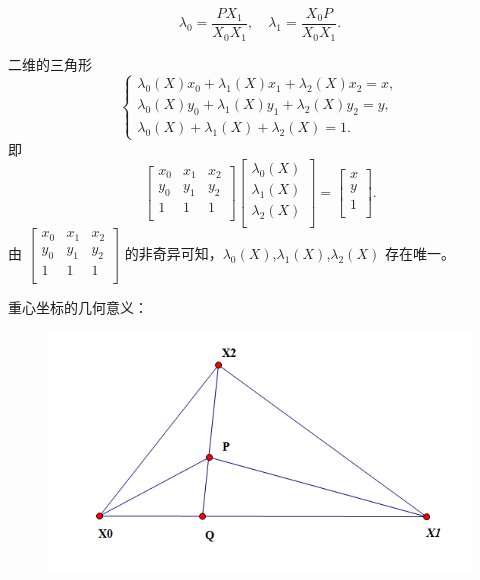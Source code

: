 \documentclass[12pt,a4paper]{article}
\begin{document}
$$\lambda _0 =\frac{PX_1}{X_0 X_1},\quad \lambda _1 =\frac{X_0 P}{X_0 X_1}.$$

二维的三角形
$$
\begin{cases}
\lambda _0(X)x_0+\lambda _1(X)x_1+\lambda _2(X)x_2=x,\\
\lambda _0(X)y_0+\lambda _1(X)y_1+\lambda _2(X)y_2=y,\\
\lambda _0(X)+\lambda _1(X)+\lambda _2(X)=1.
\end{cases}
$$
即
$$
\begin{bmatrix}
x_0 & x_1 & x_2\\
y_0 & y_1 & y_2\\
1 & 1 & 1\\
\end{bmatrix}
\begin{bmatrix}
\lambda _0(X)\\
\lambda _1(X)\\
\lambda _2(X)\\
\end{bmatrix}=\begin{bmatrix}
x\\
y\\
1\\
\end{bmatrix}.
$$
由 $\begin{bmatrix}
x_0 & x_1 & x_2\\
y_0 & y_1 & y_2\\
1 & 1 & 1\\
\end{bmatrix}$ 的非奇异可知，$\lambda _0(X)$,$\lambda _1(X)$,$\lambda _2(X)$ 存在唯一。

重心坐标的几何意义：

\begin{figure}[H]
\centering
\includegraphics[scale=0.7]{./figures/2.png}
\caption{}
\end{figure}
\end{document}
